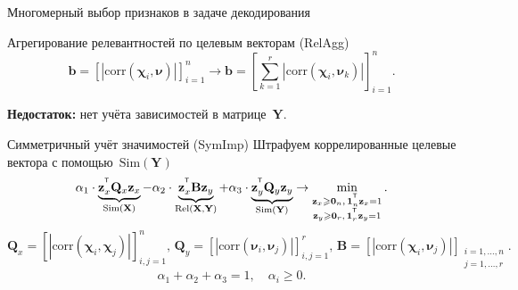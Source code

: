 \documentclass[9pt]{beamer}
\renewcommand{\geq}{\ensuremath{\geqslant}}
\newcommand{\bb}{\mathbf{b}}
\newcommand{\bz}{\mathbf{z}}
\newcommand{\bB}{\mathbf{B}}
\newcommand{\bQ}{\mathbf{Q}}
\newcommand{\bX}{\mathbf{X}}
\newcommand{\bY}{\mathbf{Y}}
\newcommand{\bchi}{\boldsymbol{\chi}}
\newcommand{\bnu}{\boldsymbol{\nu}}
\newcommand{\T}{^{\text{\tiny\sffamily\upshape\mdseries T}}}
\newcommand{\bOne}{\boldsymbol{1}}
\newcommand{\bZero}{\boldsymbol{0}}
\begin{document}
\begin{frame}{Многомерный выбор признаков в задаче декодирования}
\begin{block}{Агрегирование релевантностей по целевым векторам (RelAgg)}
\[
\bb = \left[\left|\text{corr}(\bchi_i, \bnu)\right|\right]_{i=1}^n \rightarrow \bb = \left[\sum_{k=1}^r\left|\text{corr}(\bchi_i, \bnu_k)\right|\right]_{i=1}^n.
\]
\end{block}
{\bf Недостаток:} нет учёта зависимостей в матрице~$\bY$. 

\begin{block}{Симметричный учёт значимостей (SymImp)}
Штрафуем коррелированные целевые вектора с помощью~$\text{Sim} (\bY)$
\[
\alpha_1 \cdot \underbrace{\bz_x^{\T} \bQ_x \bz_x}_{\text{Sim}(\bX)} - \alpha_2 \cdot \underbrace{\bz_x^{\T} \bB \bz_y}_{\text{Rel}(\bX, \bY)} + \alpha_3 \cdot \underbrace{\bz_y^{\T} \bQ_y \bz_y}_{\text{Sim}(\bY)} \rightarrow \min_{\substack{\bz_x \geq \bZero_n, \, \bOne_n^{\T}\bz_x=1 \\ \bz_y \geq \bZero_r, \, \bOne_r^{\T}\bz_y=1}}.
\]
\[
\bQ_x = \left[ \left| \text{corr}(\bchi_i, \bchi_j) \right| \right]_{i,j=1}^n, \,
\bQ_y = \left[ \left| \text{corr}(\bnu_i, \bnu_j) \right| \right]_{i,j=1}^r, \,
\bB =  \left[ \left| \text{corr}(\bchi_i, \bnu_j) \right| \right]_{\substack{i=1, \dots, n \\ j=1, \dots, r}}.
\]
\[
\alpha_1 + \alpha_2 + \alpha_3 = 1, \quad \alpha_i \geq 0.
\] 
\end{block}
\end{frame}
\end{document}
